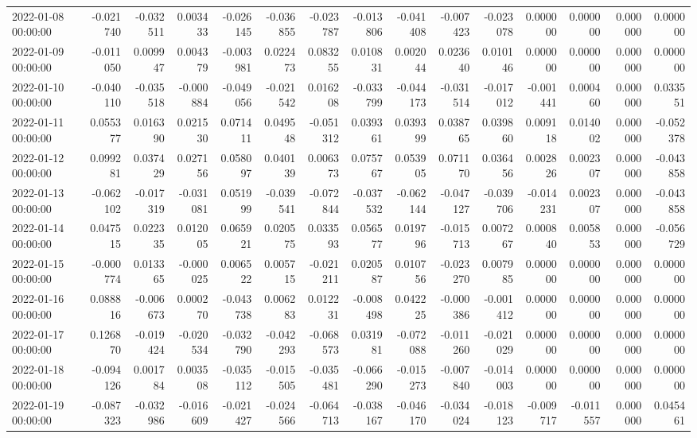 \begin{tabular}{lrrrrrrrrrrrrrr}
2022-01-08 00:00:00 & -0.021740 & -0.032511 & 0.003433 & -0.026145 & -0.036855 & -0.023787 & -0.013806 & -0.041408 & -0.007423 & -0.023078 & 0.000000 & 0.000000 & 0.000000 & 0.000000 \\
2022-01-09 00:00:00 & -0.011050 & 0.009947 & 0.004379 & -0.003981 & 0.022473 & 0.083255 & 0.010831 & 0.002044 & 0.023640 & 0.010146 & 0.000000 & 0.000000 & 0.000000 & 0.000000 \\
2022-01-10 00:00:00 & -0.040110 & -0.035518 & -0.000884 & -0.049056 & -0.021542 & 0.016208 & -0.033799 & -0.044173 & -0.031514 & -0.017012 & -0.001441 & 0.000460 & 0.000000 & 0.033551 \\
2022-01-11 00:00:00 & 0.055377 & 0.016390 & 0.021530 & 0.071411 & 0.049548 & -0.051312 & 0.039361 & 0.039399 & 0.038765 & 0.039860 & 0.009118 & 0.014002 & 0.000000 & -0.052378 \\
2022-01-12 00:00:00 & 0.099281 & 0.037429 & 0.027156 & 0.058097 & 0.040139 & 0.006373 & 0.075767 & 0.053905 & 0.071170 & 0.036456 & 0.002826 & 0.002307 & 0.000000 & -0.043858 \\
2022-01-13 00:00:00 & -0.062102 & -0.017319 & -0.031081 & 0.051999 & -0.039541 & -0.072844 & -0.037532 & -0.062144 & -0.047127 & -0.039706 & -0.014231 & 0.002307 & 0.000000 & -0.043858 \\
2022-01-14 00:00:00 & 0.047515 & 0.022335 & 0.012005 & 0.065921 & 0.020575 & 0.033593 & 0.056577 & 0.019796 & -0.015713 & 0.007267 & 0.000840 & 0.005853 & 0.000000 & -0.056729 \\
2022-01-15 00:00:00 & -0.000774 & 0.013365 & -0.000025 & 0.006522 & 0.005715 & -0.021211 & 0.020587 & 0.010756 & -0.023270 & 0.007985 & 0.000000 & 0.000000 & 0.000000 & 0.000000 \\
2022-01-16 00:00:00 & 0.088816 & -0.006673 & 0.000270 & -0.043738 & 0.006283 & 0.012231 & -0.008498 & 0.042225 & -0.000386 & -0.001412 & 0.000000 & 0.000000 & 0.000000 & 0.000000 \\
2022-01-17 00:00:00 & 0.126870 & -0.019424 & -0.020534 & -0.032790 & -0.042293 & -0.068573 & 0.031981 & -0.072088 & -0.011260 & -0.021029 & 0.000000 & 0.000000 & 0.000000 & 0.000000 \\
2022-01-18 00:00:00 & -0.094126 & 0.001784 & 0.003508 & -0.035112 & -0.015505 & -0.035481 & -0.066290 & -0.015273 & -0.007840 & -0.014003 & 0.000000 & 0.000000 & 0.000000 & 0.000000 \\
2022-01-19 00:00:00 & -0.087323 & -0.032986 & -0.016609 & -0.021427 & -0.024566 & -0.064713 & -0.038167 & -0.046170 & -0.034024 & -0.018123 & -0.009717 & -0.011557 & 0.000000 & 0.045461 \\

\end{tabular}
